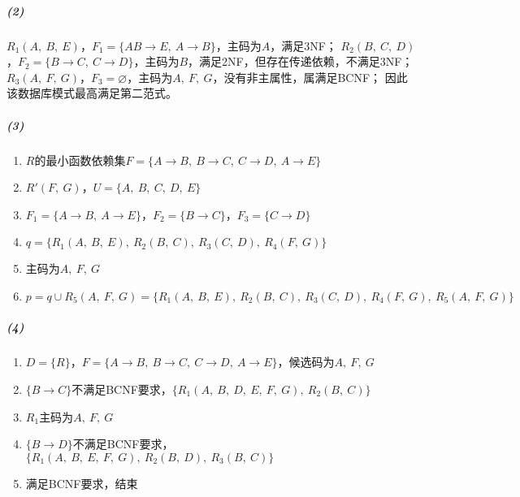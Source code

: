 \documentclass{article}
\begin{document}
\subparagraph{(2)}
$R_1(A,\ B,\ E)$，$F_1 = \{AB \rightarrow E,\ A \rightarrow B\}$，主码为$A$，满足3NF；
$R_2(B,\ C,\ D)$，$F_2 = \{B \rightarrow C,\ C \rightarrow D\}$，主码为$B$，满足2NF，但存在传递依赖，不满足3NF；
$R_3(A,\ F,\ G)$，$F_3 = \varnothing$，主码为$A,\ F,\  G$，没有非主属性，属满足BCNF；
因此该数据库模式最高满足第二范式。

\subparagraph{(3)}
\begin{enumerate}[label = \emph{\alph*}.]
    \item $R$的最小函数依赖集$F = \{A \rightarrow B,\ B \rightarrow C,\ C \rightarrow D,\ A \rightarrow E\}$
    \item $R'(F,\ G)$，$U = \{A,\ B,\ C,\ D,\ E\}$
    \item $F_1 = \{A \rightarrow B,\ A \rightarrow E\}$，$F_2 = \{B \rightarrow C\}$，$F_3 = \{C \rightarrow D\}$
    \item $q = \{R_1(A,\ B,\ E),\ R_2(B,\ C),\ R_3(C,\ D),\ R_4(F,\ G)\}$
    \item 主码为$A,\ F,\  G$
    \item $p = q \cup R_5(A,\ F,\ G) = \{R_1(A,\ B,\ E),\ R_2(B,\ C),\ R_3(C,\ D),\ R_4(F,\ G),\ R_5(A,\ F,\ G)\}$
\end{enumerate}

\subparagraph{(4)}
\begin{enumerate}[label = \emph{\alph*}.]
    \item $D = \{R\}$，$F = \{A \rightarrow B,\ B \rightarrow C,\ C \rightarrow D,\ A \rightarrow E\}$，候选码为$A,\ F,\  G$
    \item $\{B \rightarrow C\}$不满足BCNF要求，$\{R_1(A,\ B,\ D,\ E,\ F,\ G),\ R_2(B,\ C)\}$
    \item $R_1$主码为$A,\ F,\  G$
    \item $\{B \rightarrow D\}$不满足BCNF要求，$\{R_1(A,\ B,\ E,\ F,\ G),\ R_2(B,\ D),\ R_3(B,\ C)\}$
    \item 满足BCNF要求，结束
\end{enumerate}
\end{document}
